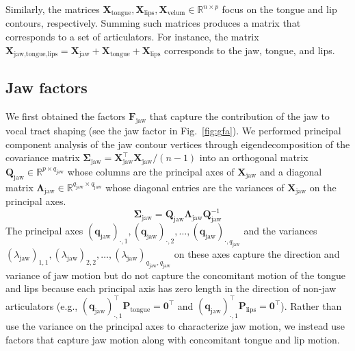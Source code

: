 \documentclass[preprint]{JASAnew}\usepackage[]{graphicx}\usepackage[]{color}
\begin{document}
%
Similarly, the matrices $\mathbf{X}_\text{tongue},\mathbf{X}_\text{lips},\mathbf{X}_\text{velum} \in \mathbb{R}^{n\times p}$ focus on the tongue and lip contours, respectively. 
% 
Summing such matrices produces a matrix that corresponds to a set of articulators. For instance, the matrix $\mathbf{X}_{\text{jaw,tongue,lips}} = \mathbf{X}_\text{jaw} + \mathbf{X}_\text{tongue} + \mathbf{X}_\text{lips}$ corresponds to the jaw, tongue, and lips.





\subsection{Jaw factors}
\label{subsec:jawfactors}

We first obtained the factors $\mathbf{F}_\text{jaw}$ that capture the contribution of the jaw to vocal tract shaping (see the jaw factor in Fig.~\ref{fig:gfa}). 
% 
We performed principal component analysis of the jaw contour vertices through eigendecomposition of the covariance matrix $\boldsymbol{\Sigma}_\text{jaw} = \mathbf{X}_\text{jaw}^\intercal \mathbf{X}_\text{jaw}/(n-1)$ into an orthogonal matrix $\mathbf{Q}_\text{jaw} \in \mathbb{R}^{p\times q_\text{jaw}}$ whose columns are the principal axes of $\mathbf{X}_\text{jaw}$ and a diagonal matrix $\boldsymbol{\Lambda}_\text{jaw} \in \mathbb{R}^{q_\text{jaw} \times q_\text{jaw}}$ whose diagonal entries are the variances of $\mathbf{X}_\text{jaw}$ on the principal axes.
% 
\begin{equation}
\boldsymbol{\Sigma}_\text{jaw} = \mathbf{Q}_\text{jaw}\boldsymbol{\Lambda}_\text{jaw} \mathbf{Q}_\text{jaw}^{-1}
\end{equation}
%
The principal axes $(\mathbf{q}_\text{jaw})_{\cdot,1}, (\mathbf{q}_\text{jaw})_{\cdot,2}, \ldots, (\mathbf{q}_\text{jaw})_{\cdot,q_\text{jaw}}$ and the variances $(\lambda_\text{jaw})_{1,1}, (\lambda_\text{jaw})_{2,2}, \ldots, (\lambda_\text{jaw})_{q_\text{jaw},q_\text{jaw}}$ on these axes capture the direction and variance of jaw motion but do not capture the concomitant motion of the tongue and lips 
% 
because each principal axis has zero length in the direction of non-jaw articulators 
% 
(e.g., $(\mathbf{q}_\text{jaw})_{\cdot,1}^\intercal \mathbf{P}_\text{tongue} = \mathbf{0}^\intercal$ and $(\mathbf{q}_\text{jaw})_{\cdot,1}^\intercal \mathbf{P}_\text{lips} = \mathbf{0}^\intercal$). 
% 
Rather than use the variance on the principal axes to characterize jaw motion, we instead use factors that capture jaw motion along with concomitant tongue and lip motion. 
\end{document}
